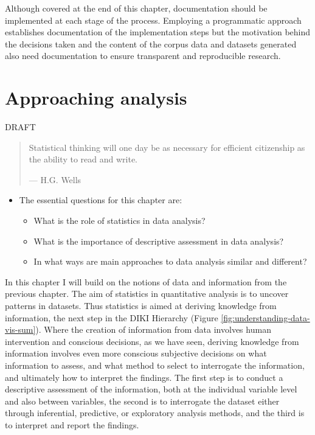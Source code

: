 \documentclass[
]{article}
\providecommand{\tightlist}{%
  \setlength{\itemsep}{0pt}\setlength{\parskip}{0pt}}
\newenvironment{rmdblock}[1]
  {\begin{shaded*}
  \begin{itemize}
  \renewcommand{\labelitemi}{
    \raisebox{-.5\height}[0pt][0pt]{
      {\setkeys{Gin}{width=2em,keepaspectratio}\texttt{[image: assets/images/\#1]}}
    }
  }
  \item
  }
  {
  \end{itemize}
  \end{shaded*}
  }
\newenvironment{rmdkey}
  {\begin{rmdblock}{key}}
  {\end{rmdblock}}
\begin{document}
Although covered at the end of this chapter, documentation should be implemented at each stage of the process. Employing a programmatic approach establishes documentation of the implementation steps but the motivation behind the decisions taken and the content of the corpus data and datasets generated also need documentation to ensure transparent and reproducible research.

\hypertarget{approaching-analysis}{%
\section{Approaching analysis}\label{approaching-analysis}}

DRAFT

\begin{quote}
Statistical thinking will one day be as necessary for efficient citizenship as the ability to read and write.

--- H.G. Wells
\end{quote}

\begin{rmdkey}
The essential questions for this chapter are:

\begin{itemize}
\tightlist
\item
  What is the role of statistics in data analysis?
\item
  What is the importance of descriptive assessment in data analysis?
\item
  In what ways are main approaches to data analysis similar and
  different?
\end{itemize}
\end{rmdkey}

In this chapter I will build on the notions of data and information from the previous chapter. The aim of statistics in quantitative analysis is to uncover patterns in datasets. Thus statistics is aimed at deriving knowledge from information, the next step in the DIKI Hierarchy (Figure \ref{fig:understanding-data-vis-sum}). Where the creation of information from data involves human intervention and conscious decisions, as we have seen, deriving knowledge from information involves even more conscious subjective decisions on what information to assess, and what method to select to interrogate the information, and ultimately how to interpret the findings. The first step is to conduct a descriptive assessment of the information, both at the individual variable level and also between variables, the second is to interrogate the dataset either through inferential, predictive, or exploratory analysis methods, and the third is to interpret and report the findings.
\end{document}
